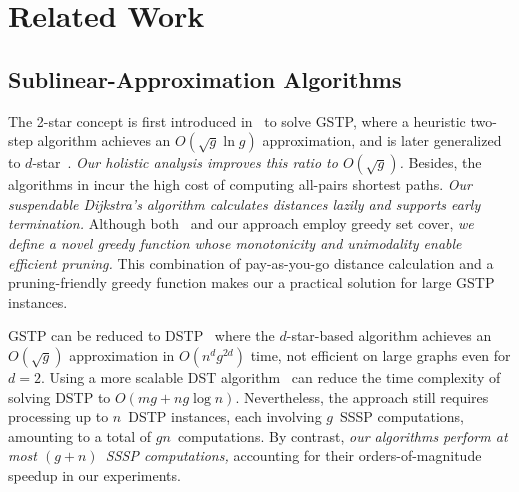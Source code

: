 \section{Related Work}
\label{sec: relatedwork}


\subsection{Sublinear-Approximation Algorithms}
\label{subsec: sub-alg}

The 2-star concept is first introduced in~\cite{dstar1} to solve GSTP, where a heuristic two-step algorithm achieves an $O(\sqrt{g}\ln g)$ approximation, and is later generalized to $d$-star~\cite{dstar2}.
\emph{Our holistic analysis improves this ratio to $O(\sqrt{g})$.}
Besides, the algorithms in \cite{dstar1,dstar2} incur the high cost of computing all-pairs shortest paths.
\emph{Our suspendable Dijkstra’s algorithm calculates distances lazily and supports early termination.}
Although both~\cite{dstar1} and our approach employ greedy set cover, \emph{we define a novel greedy function whose monotonicity and unimodality enable efficient pruning.}
This combination of pay-as-you-go distance calculation and a pruning-friendly greedy function makes our \ImprovPTS a practical solution for large GSTP instances.

GSTP can be reduced to DSTP~\cite{D_STP} where the $d$-star-based algorithm achieves an $O(\sqrt{g})$ approximation in $O(n^d g^{2d})$ time, not efficient on large graphs even for $d=2$.
Using a more scalable DST algorithm~\cite{DiST} can reduce the time complexity of solving DSTP to $O(mg+ng\log n)$. Nevertheless, the approach still requires processing up to $n$~DSTP instances, each involving $g$~SSSP computations, amounting to a total of $gn$~computations.
By contrast, \emph{our algorithms perform at most $(g+n)$~SSSP computations,} accounting for their orders-of-magnitude speedup in our experiments.



